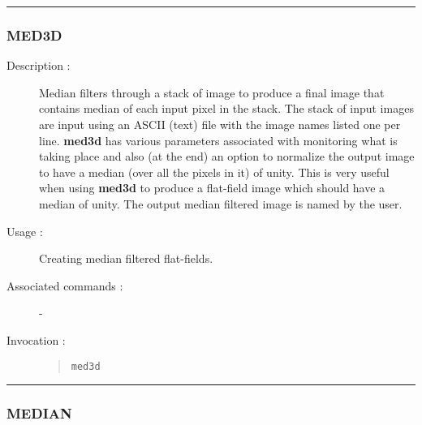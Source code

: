 \hrule 
\subsubsection*{\label{MED3D}MED3D}

\begin{description}

\item[Description :] Median filters through a stack of image to produce
a final image that contains median of each input pixel in the stack.
The stack of input images are input using an ASCII (text) file with the
image names listed one per line.  {\bf med3d} has various parameters
associated with monitoring what is taking place and also (at the end)
an option to normalize the output image to have a median (over all the
pixels in it) of unity.  This is very useful when using {\bf med3d} to
produce a flat-field image which should have a median of unity.  The
output median filtered image is named by the user.

\item[Usage :] Creating median filtered flat-fields.
\item[Associated commands :] -
\item[Invocation :]

\begin{quote}{\tt  med3d }\end{quote}

\end{description}

\hrule 
\subsubsection*{\label{MEDIAN}MEDIAN}


